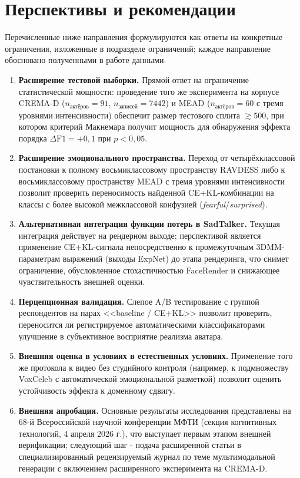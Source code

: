 \documentclass[a4paper, 12pt, oneside, openany]{article}
\begin{document}
\section{Перспективы и рекомендации}

Перечисленные ниже направления формулируются как ответы на конкретные ограничения, изложенные в подразделе ограничений; каждое направление обосновано полученными в работе данными.

\begin{enumerate}
\item \textbf{Расширение тестовой выборки.} Прямой ответ на ограничение статистической мощности: проведение того же эксперимента на корпусе CREMA-D ($n_{\text{актёров}}=91$, $n_{\text{записей}}=7442$) и MEAD ($n_{\text{актёров}}=60$ с тремя уровнями интенсивности) обеспечит размер тестового сплита $\gtrsim 500$, при котором критерий Макнемара получит мощность для обнаружения эффекта порядка $\Delta\text{F1}=+0{,}1$ при $p<0{,}05$.
\item \textbf{Расширение эмоционального пространства.} Переход от четырёхклассовой постановки к полному восьмиклассовому пространству RAVDESS либо к восьмиклассовому пространству MEAD с тремя уровнями интенсивности позволит проверить переносимость найденной CE+KL-комбинации на классы с более высокой межклассовой конфузией (\textit{fearful}/\textit{surprised}).
\item \textbf{Альтернативная интеграция функции потерь в SadTalker.} Текущая интеграция действует на рендерном выходе; перспективой является применение CE+KL-сигнала непосредственно к промежуточным 3DMM-параметрам выражений (выходы ExpNet) до этапа рендеринга, что снимет ограничение, обусловленное стохастичностью FaceRender и снижающее чувствительность внешней оценки.
\item \textbf{Перцепционная валидация.} Слепое A/B тестирование с группой респондентов на парах <<baseline / CE+KL>> позволит проверить, переносится ли регистрируемое автоматическими классификаторами улучшение в субъективное восприятие реализма аватара.
\item \textbf{Внешняя оценка в условиях в естественных условиях.} Применение того же протокола к видео без студийного контроля (например, к подмножеству VoxCeleb с автоматической эмоциональной разметкой) позволит оценить устойчивость эффекта к доменному сдвигу.
\item \textbf{Внешняя апробация.} Основные результаты исследования представлены на 68-й Всероссийской научной конференции МФТИ (секция когнитивных технологий, 4 апреля 2026 г.), что выступает первым этапом внешней верификации; следующий шаг - подача расширенной статьи в специализированный рецензируемый журнал по теме мультимодальной генерации с включением расширенного эксперимента на CREMA-D.

\end{enumerate}
\end{document}
